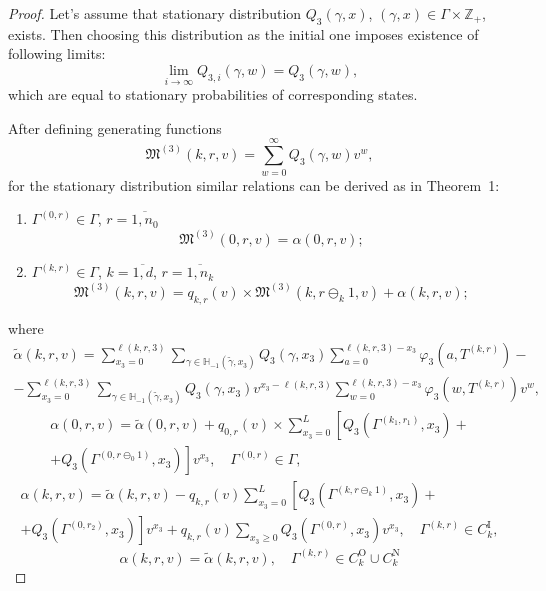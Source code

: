 \documentclass[runningheads,a4paper]{llncs}
\begin{document}
\begin{proof}

Let's assume that stationary distribution $Q_3(\gamma,x)$, $(\gamma,x)\in \Gamma \times {\mathbb Z}_+$, 
exists. Then choosing this distribution as the  initial one imposes existence of following limits:
$$
\lim_{i\to \infty} Q_{3,i}(\gamma,w) = Q_3(\gamma,w),
$$
which are equal to stationary probabilities of corresponding states.

After defining generating functions
$$
\mathfrak{M}^{(3)}(k,r,v) = \sum_{w=0}^{\infty} Q_3(\gamma,w) v^w,
$$
 for the stationary distribution similar relations can be derived as in Theorem~1:
 \begin{enumerate}
\item $ \Gamma^{(0,r)} \in \Gamma$, $r = \overline{1,n_0}$ 
\begin{equation}
\mathfrak{M}^{(3)}(0,r,v) = \alpha(0,r,v);
\label{three:generation:one}
\end{equation}
\item $\Gamma^{(k,r)} \in \Gamma $, $k =\overline{1,d}$, $r=\overline{1,n_k}$
\begin{equation}
\mathfrak{M}^{(3)}(k,r,v) = q_{k,r} (v)\times  \mathfrak{M}^{(3)}(k,r \ominus_{k} 1,v) + \alpha(k,r,v);
\label{three:generation:two}
\end{equation}
\end{enumerate}
where 
\begin{multline*}
\tilde{\alpha}(k,r,v) = \sum_{x_3=0}^{\ell(k,r,3)}\sum_{\gamma \in {\mathbb H}_{-1}(\tilde{\gamma},x_3)} Q_3(\gamma,x_3) \sum_{a=0}^{\ell(k,r,3) - x_3} \varphi_3(a,T^{(k,r)}) - \\
- \sum_{x_3=0}^{\ell(k,r,3)}  \sum_{\gamma \in {\mathbb H}_{-1}(\tilde{\gamma},x_3)} Q_3(\gamma,x_3)v^{x_3-\ell(k,r,3)} \sum_{w=0}^{\ell(k,r,3) -x_3}
\varphi_3(w,T^{(k,r)}) v^w,
\end{multline*}
\begin{multline*}
\alpha(0,r,v) =\tilde{\alpha}(0,r,v) + q_{0,r}(v) \times \sum_{x_3=0}^{L} \left[ Q_{3}(\Gamma^{(k_1,r_1)},x_3) +\right. \\
\left. + Q_{3}(\Gamma^{(0,r\ominus_0 1)},x_3) \right] v^{x_3}, \quad \Gamma^{(0,r)} \in \Gamma,
\end{multline*}
\begin{multline*}
\alpha(k,r,v) =\tilde{\alpha}(k,r,v) - q_{k,r}(v)\sum_{x_3=0}^{L} \left[ Q_{3}(\Gamma^{(k,r\ominus_{k} 1)},x_3) \right. + \\ +\left.  Q_{3}(\Gamma^{(0,r_2)},x_3) \right] v^{x_3}
+ q_{k,r}(v)\sum_{x_3 \geqslant 0} Q_{3}(\Gamma^{(0,r)},x_3)v^{x_3}, \quad \Gamma^{(k, r)} \in C_{k}^{\mathrm{I}},
\end{multline*}
\begin{equation*}
\alpha(k,r,v) =\tilde{\alpha}(k,r,v), \quad \Gamma^{(k, r)} \in C_{k}^{\mathrm{O}} \cup C_{k}^{\mathrm{N}}
\end{equation*}


\end{proof}
\end{document}
